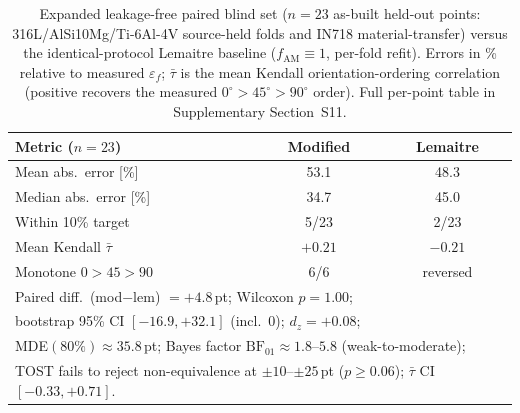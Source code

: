 \documentclass[12pt,a4paper,twocolumn]{article}
\begin{document}
\begin{table}[htbp]
\centering
\caption{Expanded leakage-free paired blind set ($n = 23$ as-built held-out points: 316L/AlSi10Mg/Ti-6Al-4V source-held folds and IN718 material-transfer) versus the identical-protocol Lemaitre baseline ($f_{\mathrm{AM}} \equiv 1$, per-fold refit). Errors in \% relative to measured $\varepsilon_f$; $\bar\tau$ is the mean Kendall orientation-ordering correlation (positive recovers the measured $0^\circ\!>\!45^\circ\!>\!90^\circ$ order). Full per-point table in Supplementary Section~S11.}
\label{tab:blind_expanded}
\footnotesize
\begin{tabular}{l c c}
\hline
\textbf{Metric ($n=23$)} & \textbf{Modified} & \textbf{Lemaitre} \\
\hline
Mean abs.\ error [\%]   & 53.1 & 48.3 \\
Median abs.\ error [\%] & 34.7 & 45.0 \\
Within 10\% target      & 5/23 & 2/23 \\
Mean Kendall $\bar\tau$ & $+0.21$ & $-0.21$ \\
Monotone $0\!>\!45\!>\!90$ & 6/6 & reversed \\
\hline
\multicolumn{3}{l}{Paired diff.\ (mod$-$lem) $=+4.8$\,pt; Wilcoxon $p=1.00$;}\\
\multicolumn{3}{l}{bootstrap 95\% CI $[-16.9,+32.1]$ (incl.\ 0); $d_z=+0.08$;}\\
\multicolumn{3}{l}{MDE$(80\%)\approx 35.8$\,pt; Bayes factor $\mathrm{BF}_{01}\approx1.8$--$5.8$ (weak-to-moderate);}\\
\multicolumn{3}{l}{TOST fails to reject non-equivalence at $\pm10$--$\pm25$\,pt ($p\ge0.06$); $\bar\tau$ CI $[-0.33,+0.71]$.}\\
\hline
\end{tabular}
\end{table}
\end{document}
